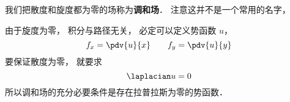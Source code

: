 
\begin{issues}
\issueDraft
\end{issues}

我们把散度和旋度都为零的场称为\textbf{调和场}． 注意这并不是一个常用的名字， 

由于旋度为零， 积分与路径无关， 必定可以定义势函数 $u$， 
\begin{equation}
f_x = \pdv{u}{x} \qquad f_y = \pdv{u}{y}
\end{equation}
要保证散度为零， 就要求
\begin{equation}
\laplacian u = 0
\end{equation}
所以调和场的充分必要条件是存在拉普拉斯为零的势函数．
